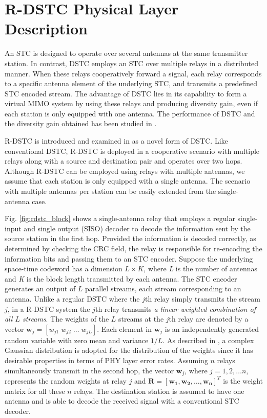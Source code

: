 \documentclass[peerreview,draftcls,onecolumn,12pt,a4paper]{IEEEtran}
\begin{document}
\vspace{-0.2in}
\section{R-DSTC Physical Layer Description}
\label{R-DSTC}

An STC is designed to operate over several antennas at the same transmitter station. In contrast, DSTC employs an STC over multiple relays in a distributed manner. When these relays cooperatively forward a signal, each relay corresponds to a specific antenna element of the underlying STC, and transmits a predefined STC encoded stream. The advantage of DSTC lies in its capability to form a virtual MIMO system by using these relays and producing diversity gain, even if each station is only equipped with one antenna. The performance of DSTC and the diversity gain obtained has been studied in \cite{La03}. 

R-DSTC is introduced and examined in
\cite{sirkeci_scaglione_mergen_2007_SP} as a novel form of DSTC.
Like conventional DSTC, R-DSTC is deployed in a cooperative
scenario with multiple relays along with a source and destination
pair and operates over two hops. Although R-DSTC can be employed
using relays with multiple antennas, we assume that each station
is only equipped with a single antenna. The scenario with multiple
antennas per station can be easily extended from the
single-antenna case.

Fig. \ref{fig:rdstc_block} shows a single-antenna relay that
employs a regular single-input and single output (SISO) decoder to
decode the information sent by the source station in the first
hop. Provided the information is decoded correctly, as determined
by checking the CRC field, the relay is responsible for
re-encoding the information bits and passing them to an STC
encoder. Suppose the underlying space-time codeword has a
dimension $L \times K$, where \emph{L} is the number of antennas
and \emph{K} is the block length transmitted by each antenna. The
STC encoder generates an output of $L$ parallel streams, each
stream corresponding to an antenna. Unlike a regular DSTC where
the $j$th relay simply transmits the stream $j$, in a R-DSTC
system the $j$th relay transmits \emph{a linear weighted
combination of all $L$ streams}. The weights of the $L$ streams at
the $j$th relay are denoted by a vector $\mathbf{w}_j=[w_{j1} \;
w_{j2} \; \ldots \; w_{jL}]$. Each element in $\mathbf{w}_j$ is an
independently generated random variable with zero mean and
variance $1/L$. As described in
\cite{sirkeci_scaglione_mergen_2007_SP}, a complex Gaussian
distribution is adopted for the distribution of the weights since
it has desirable properties in terms of PHY layer error rates.
Assuming $n$ relays simultaneously transmit in the second hop, the
vector $\mathbf{w}_j$, where $j=1,2,\dots n$, represents the
random weights at relay $j$ and $\mathbf{R}=[\mathbf{w_1, w_2,
\dots , w_n}]^T$ is the weight matrix for all these $n$ relays.
The destination station is assumed to have one antenna and is able
to decode the received signal with a conventional STC decoder. 
\end{document}
